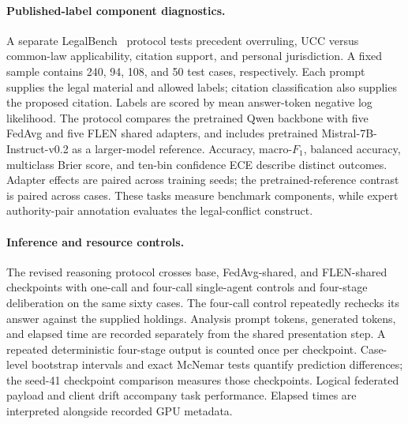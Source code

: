 \documentclass[a4paper,fleqn]{cas-sc}
\begin{document}
\paragraph{Published-label component diagnostics.}
A separate LegalBench~\citep{guha2023legalbench} protocol tests precedent overruling, UCC versus common-law applicability, citation support, and personal jurisdiction. A fixed sample contains 240, 94, 108, and 50 test cases, respectively. Each prompt supplies the legal material and allowed labels; citation classification also supplies the proposed citation. Labels are scored by mean answer-token negative log likelihood. The protocol compares the pretrained Qwen backbone with five FedAvg and five FLEN shared adapters, and includes pretrained Mistral-7B-Instruct-v0.2 as a larger-model reference. Accuracy, macro-$F_1$, balanced accuracy, multiclass Brier score, and ten-bin confidence ECE describe distinct outcomes. Adapter effects are paired across training seeds; the pretrained-reference contrast is paired across cases. These tasks measure benchmark components, while expert authority-pair annotation evaluates the legal-conflict construct.

\paragraph{Inference and resource controls.}
The revised reasoning protocol crosses base, FedAvg-shared, and FLEN-shared checkpoints with one-call and four-call single-agent controls and four-stage deliberation on the same sixty cases. The four-call control repeatedly rechecks its answer against the supplied holdings. Analysis prompt tokens, generated tokens, and elapsed time are recorded separately from the shared presentation step. A repeated deterministic four-stage output is counted once per checkpoint. Case-level bootstrap intervals and exact McNemar tests quantify prediction differences; the seed-41 checkpoint comparison measures those checkpoints. Logical federated payload and client drift accompany task performance. Elapsed times are interpreted alongside recorded GPU metadata.
\end{document}
